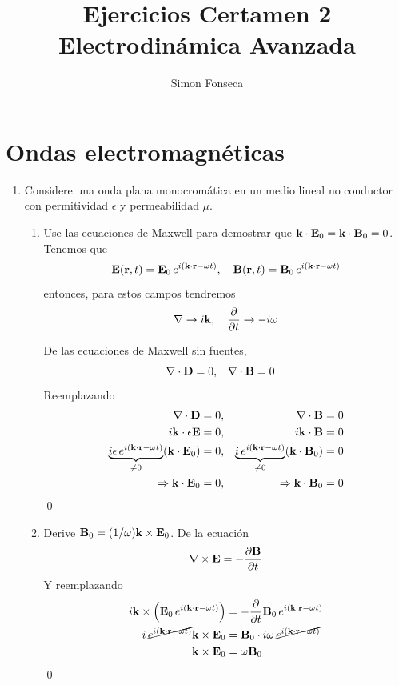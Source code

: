 \documentclass[]{article}
\title{Ejercicios Certamen 2 Electrodinámica Avanzada}
\author{Simon Fonseca}
\numberwithin{equation}{section}
\begin{document}
\maketitle
\section{Ondas electromagnéticas}
\begin{enumerate}
	\item Considere una onda plana monocromática en un medio lineal no conductor con permitividad $\epsilon$ y permeabilidad $\mu$.
	\begin{enumerate}
		\item[(a)] Use las ecuaciones de Maxwell para demostrar que $\mathbf{k} \cdot \mathbf{E}_0 = \mathbf{k} \cdot \mathbf{B}_0 = 0$.
		\resp Tenemos que
		\begin{equation}
			\mathbf{E}(\mathbf{r},t) = \mathbf{E}_0 \, e^{i(\mathbf{k}\cdot\mathbf{r} - \omega t)}, \quad \mathbf{B}(\mathbf{r},t) = \mathbf{B}_0 \, e^{i(\mathbf{k}\cdot\mathbf{r} - \omega t)}
		\end{equation}
		entonces, para estos campos tendremos
		\begin{equation}
			\nabla \to i\mathbf{k}, \quad \dfrac{\partial }{\partial t} \to -i\omega
		\end{equation}
		
		De las ecuaciones de Maxwell sin fuentes,
		\begin{align}
			\nabla\cdot\mathbf{D} &= 0, & \nabla\cdot\mathbf{B} &= 0
		\end{align}
		Reemplazando
		\begin{align}
			\nabla\cdot\mathbf{D} &= 0, & \nabla\cdot\mathbf{B} &= 0\nonumber\\
			i\mathbf{k}\cdot\epsilon\mathbf{E} &= 0, & i\mathbf{k}\cdot\mathbf{B} &= 0\nonumber\\
			\underbrace{i\epsilon \, e^{i(\mathbf{k}\cdot\mathbf{r} - \omega t)}}_{\neq 0} (\mathbf{k}\cdot\mathbf{E}_0) &= 0, & \underbrace{i \, e^{i(\mathbf{k}\cdot\mathbf{r} - \omega t)}}_{\neq 0} (\mathbf{k}\cdot\mathbf{B}_0) &= 0\nonumber\\
			\Rightarrow \mathbf{k}\cdot\mathbf{E}_0 &= 0, & \Rightarrow \mathbf{k}\cdot\mathbf{B}_0 &= 0
		\end{align}
		\qed
		
		\item[(b)] Derive $\mathbf{B}_0 = (1/\omega)\mathbf{k} \times \mathbf{E}_0$.
		\resp De la ecuación
		\begin{equation}
			\nabla\times\mathbf{E} = -\dfrac{\partial \mathbf{B}}{\partial t}
		\end{equation}
		Y reemplazando 
		\begin{align}
			i\mathbf{k}\times\left(\mathbf{E}_0 \, e^{i(\mathbf{k}\cdot\mathbf{r} - \omega t)}\right) &= - \dfrac{\partial }{\partial t}\mathbf{B}_0 \, e^{i(\mathbf{k}\cdot\mathbf{r} - \omega t)} \nonumber\\
			i \, \cancel{e^{i(\mathbf{k}\cdot\mathbf{r} - \omega t)}} \mathbf{k} \times \mathbf{E}_0 &= \mathbf{B}_0 \cdot i \omega \, \cancel{e^{i(\mathbf{k}\cdot\mathbf{r} - \omega t)}} \nonumber\\
			\mathbf{k} \times \mathbf{E}_0 &= \omega \mathbf{B}_0
		\end{align}
		\qed
		

\end{enumerate}
\end{enumerate}
\end{document}
